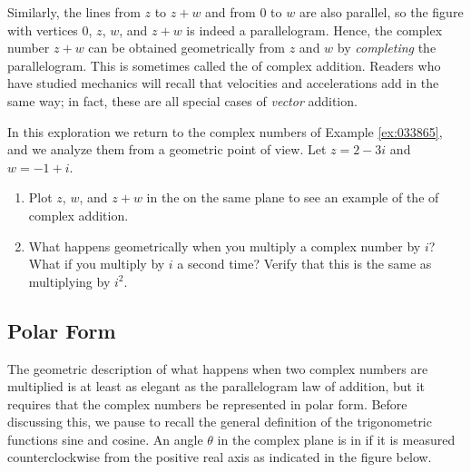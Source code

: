 \documentclass{ximera}
\begin{document}
Similarly, the lines from $z$ to $z + w$ and from $0$ to $w$ are also parallel, so the figure with vertices $0$, $z$, $w$, and $z + w$ is indeed a parallelogram. Hence, the complex number $z + w$ can be obtained geometrically from $z$ and $w$ by \textit{completing} the parallelogram. This is sometimes called the 
 of complex addition. Readers who have studied mechanics will recall
that velocities and accelerations add in the same way; in fact, these
are all special cases of \textit{vector} addition.

\begin{exploration}\label{exp:geometry_complex_numbers}
In this exploration we return to the complex numbers of Example \ref{ex:033865}, and we analyze them from a geometric point of view.  Let $z = 2 - 3i$ and $w = -1 + i$.  
\begin{enumerate}
    \item Plot $z$, $w$, and $z+w$ in the on the same plane to see an example of the  of complex addition.
    \item What happens geometrically when you multiply a complex number by $i$?  What if you multiply by $i$ a second time?  Verify that this is the same as multiplying by $i^2$.
    
\end{enumerate}

\end{exploration}

\subsection*{Polar Form}
The geometric description of what
happens when two complex numbers are multiplied is at least as elegant
as the parallelogram law of addition, but it requires that the complex
numbers be represented in polar form. Before discussing this, we pause
to recall the general definition of the trigonometric functions sine and
 cosine. An angle $\theta$ in the complex plane is in  if it is measured counterclockwise from the positive real axis as indicated in the figure below.



\begin{center}
 \end{center}
\end{document}
